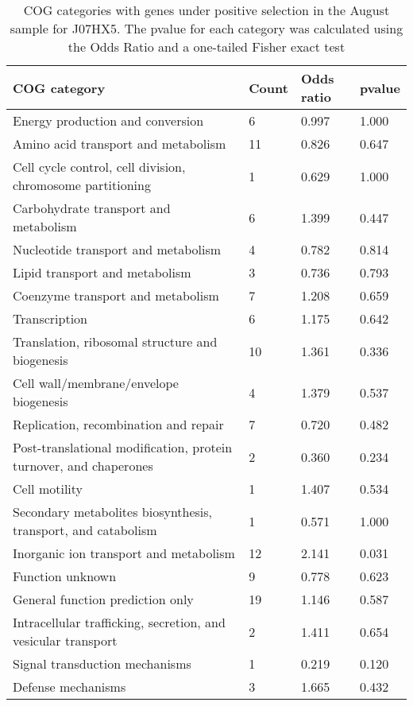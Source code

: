 \begin{table}[hb]
\footnotesize 
	\tabcolsep=0.11cm 
\caption{COG categories with genes under positive selection in the August sample for J07HX5. The pvalue for each category was calculated using the Odds Ratio and a one-tailed Fisher exact test} 
\begin{tabularx}{\textwidth}{L{6cm}R{2cm}R{2cm}R{2cm}} 
\hline 
\textbf{COG category} & \textbf{Count} & \textbf{Odds ratio} & \textbf{pvalue} \\ 
\hline 
Energy production and conversion & 6 & 0.997 & 1.000 \\ 
Amino acid transport and metabolism & 11 & 0.826 & 0.647 \\ 
Cell cycle control, cell division, chromosome partitioning & 1 & 0.629 & 1.000 \\ 
Carbohydrate transport and metabolism & 6 & 1.399 & 0.447 \\ 
Nucleotide transport and metabolism & 4 & 0.782 & 0.814 \\ 
Lipid transport and metabolism & 3 & 0.736 & 0.793 \\ 
Coenzyme transport and metabolism & 7 & 1.208 & 0.659 \\ 
Transcription & 6 & 1.175 & 0.642 \\ 
Translation, ribosomal structure and biogenesis & 10 & 1.361 & 0.336 \\ 
Cell wall/membrane/envelope biogenesis & 4 & 1.379 & 0.537 \\ 
Replication, recombination and repair & 7 & 0.720 & 0.482 \\ 
Post-translational modification, protein turnover, and chaperones & 2 & 0.360 & 0.234 \\ 
Cell motility & 1 & 1.407 & 0.534 \\ 
Secondary metabolites biosynthesis, transport, and catabolism & 1 & 0.571 & 1.000 \\ 
Inorganic ion transport and metabolism & 12 & 2.141 & 0.031 \\ 
Function unknown & 9 & 0.778 & 0.623 \\ 
General function prediction only & 19 & 1.146 & 0.587 \\ 
Intracellular trafficking, secretion, and vesicular transport & 2 & 1.411 & 0.654 \\ 
Signal transduction mechanisms & 1 & 0.219 & 0.120 \\ 
Defense mechanisms & 3 & 1.665 & 0.432 \\ 
\end{tabularx} 
\label{August_COG_Selection_J07HX5} 
 \end{table} 

